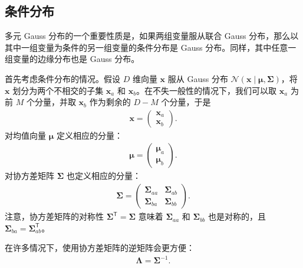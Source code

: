 \documentclass[../../main.tex]{subfiles}
\begin{document}
\subsection{条件分布}\label{subsection:ch03-条件分布}

多元 Gauss 分布的一个重要性质是，如果两组变量服从联合 Gauss 分布，那么以其中一组变量为条件的另一组变量的条件分布是 Gauss 分布。同样，其中任意一组变量的边缘分布也是 Gauss 分布。

首先考虑条件分布的情况。假设 $D$ 维向量 $\boldsymbol{x}$ 服从 Gauss 分布 $\mathcal{N}(\boldsymbol{x}\mid\boldsymbol{\mu},\boldsymbol{\Sigma})$，将 $\boldsymbol{x}$ 划分为两个不相交的子集 $\boldsymbol{x}_{a}$ 和 $\boldsymbol{x}_{b}$。在不失一般性的情况下，我们可以取 $\boldsymbol{x}_{a}$ 为前 $M$ 个分量，并取 $\boldsymbol{x}_{b}$ 作为剩余的 $D-M$ 个分量，于是
\begin{align}
\boldsymbol{x}=\begin{pmatrix}\boldsymbol{x}_{a}\\ \boldsymbol{x}_{b}\end{pmatrix}.
\label{align:ch03-分块}
\end{align}
对均值向量 $\boldsymbol{\mu}$ 定义相应的分量：
\begin{align}
\boldsymbol{\mu}=\begin{pmatrix}\boldsymbol{\mu}_{a}\\ \boldsymbol{\mu}_{b}\end{pmatrix}.
\label{align:ch03-分块均值}
\end{align}
对协方差矩阵 $\boldsymbol{\Sigma}$ 也定义相应的分量：
\begin{align}
\boldsymbol{\Sigma}=\begin{pmatrix}\boldsymbol{\Sigma}_{aa} & \boldsymbol{\Sigma}_{ab}\\ \boldsymbol{\Sigma}_{ba} & \boldsymbol{\Sigma}_{bb}\end{pmatrix}.
\label{align:ch03-分块协方差}
\end{align}
注意，协方差矩阵的对称性 $\boldsymbol{\Sigma}^{\mathsf{T}}=\boldsymbol{\Sigma}$ 意味着 $\boldsymbol{\Sigma}_{aa}$ 和 $\boldsymbol{\Sigma}_{bb}$ 也是对称的，且 $\boldsymbol{\Sigma}_{ba}=\boldsymbol{\Sigma}_{ab}^{\mathsf{T}}$。

在许多情况下，使用协方差矩阵的逆矩阵会更方便：
\begin{align}
\boldsymbol{\Lambda}=\boldsymbol{\Sigma}^{-1}.
\label{align:ch03-精度矩阵}
\end{align}
\end{document}
